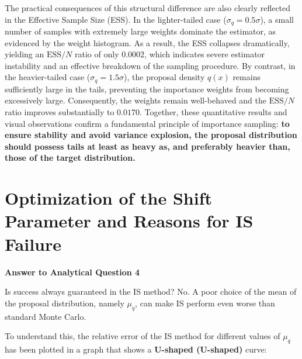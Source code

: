 \documentclass[12pt,a4paper]{article}
\begin{document}
The practical consequences of this structural difference are also clearly reflected in the Effective Sample Size (ESS). In the lighter-tailed case ($\sigma_q = 0.5\sigma$), a small number of samples with extremely large weights dominate the estimator, as evidenced by the weight histogram. As a result, the ESS collapses dramatically, yielding an $\mathrm{ESS}/N$ ratio of only $0.0002$, which indicates severe estimator instability and an effective breakdown of the sampling procedure. By contrast, in the heavier-tailed case ($\sigma_q = 1.5\sigma$), the proposal density $q(x)$ remains sufficiently large in the tails, preventing the importance weights from becoming excessively large. Consequently, the weights remain well-behaved and the $\mathrm{ESS}/N$ ratio improves substantially to $0.0170$. Together, these quantitative results and visual observations confirm a fundamental principle of importance sampling: \textbf{to ensure stability and avoid variance explosion, the proposal distribution should possess tails at least as heavy as, and preferably heavier than, those of the target distribution.}

	
	\section{Optimization of the Shift Parameter and Reasons for IS Failure}
	
	\textbf{Answer to Analytical Question 4}\label{sec:q4}
	
	Is success always guaranteed in the IS method? No. A poor choice of the mean of the proposal distribution, namely $\mu_q$, can make IS perform even worse than standard Monte Carlo.
	
	To understand this, the relative error of the IS method for different values of $\mu_q$ has been plotted in a graph that shows a \textbf{U-shaped (U-shaped)} curve:
	
\end{document}
